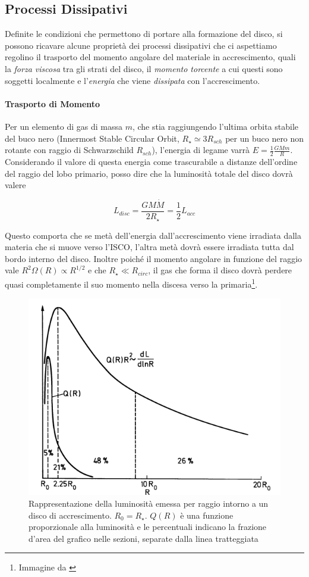 \documentclass[a4paperbi]{article}
\begin{document}
\subsection{Processi Dissipativi}

	Definite le condizioni che permettono di portare alla formazione del disco, si possono ricavare alcune proprietà dei processi dissipativi che ci aspettiamo regolino il trasporto del momento angolare del materiale in accrescimento, quali la \textit{forza viscosa} tra gli strati del disco, il \textit{momento torcente} a cui questi sono soggetti localmente e l'\textit{energia} che viene \textit{dissipata} con l'accrescimento.
	
	\paragraph{Trasporto di Momento} Per un elemento di gas di massa $m$, che stia raggiungendo l'ultima orbita stabile del buco nero (Innermost Stable Circular Orbit,  $R_{\star}\simeq 3R_{sch}$ per un buco nero non rotante con raggio di Schwarzschild $R_{sch}$), l'energia di legame varrà $E=\frac{1}{2}\frac{GMm}{R}$. Considerando il valore di questa energia come trascurabile a distanze dell'ordine del raggio del lobo primario, posso dire che la luminosità totale del disco dovrà valere
	
	\begin{equation}
		L_{disc}=\frac{GM\dot{M}}{2R_{\star}}=\frac{1}{2}L_{acc}
	\end{equation}

	Questo comporta che se metà dell'energia dall'accrescimento viene irradiata dalla materia che si muove verso l'ISCO, l'altra metà dovrà essere irradiata tutta dal bordo interno del disco. Inoltre poiché il momento angolare in funzione del raggio vale $R^2\Omega(R)\propto R^{1/2}$ e che $R_{\star}\ll R_{circ}$, il gas che forma il disco dovrà perdere quasi completamente il suo momento nella discesa verso la primaria\footnote{Immagine da \cite{ShakuraSunyaev1973}}.	

	\begin{figure}[H]
		\centering
		\includegraphics[width=0.7\linewidth]{LuminositaRaggio}
		\caption{Rappresentazione della luminosità emessa per raggio intorno a un disco di accrescimento. $R_0=R_\star$. $Q(R)$ è una funzione proporzionale alla luminosità e le percentuali indicano la frazione d'area del grafico nelle sezioni, separate dalla linea tratteggiata}
		\label{fig:LuminositaRaggio}
	\end{figure}
\end{document}
